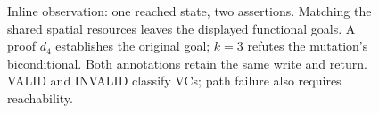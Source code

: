 \begin{figure}[t]
\centering

\caption{Inline observation: one reached state, two assertions. Matching the shared spatial
resources leaves the displayed functional goals. A proof $d_4$ establishes
the original goal; $k=3$ refutes the mutation's biconditional.
Both annotations retain the same write and return.
VALID and INVALID classify VCs; path failure also requires reachability.}
\label{fig:observation}
\end{figure}
